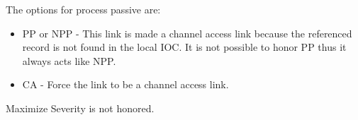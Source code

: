 The options for process passive are:

\begin{itemize}
\item PP or NPP - This link is made a channel access link because the referenced record is not found in the local IOC. It 
is not possible to honor PP thus it always acts like NPP.

\item CA - Force the link to be a channel access link.

\end{itemize}

Maximize Severity is not honored.


